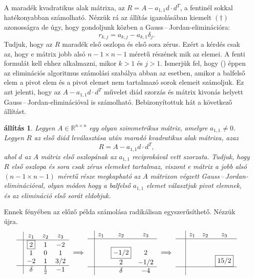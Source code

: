 \documentclass[a4paper, showtrims]{memoir}
\theoremstyle{plain}
\newtheorem{proposition}{állítás}[chapter]
\theoremstyle{remark}
\theoremstyle{definition}
\begin{document}
A maradék kvadratikus alak mátrixa, az $R=A-a_{1,1}d\cdot d^T$, a fentinél sokkal
hatékonyabban számolható.
Nézzük rá az állítás igazolásában kiemelt $(\dag)$ azonosságra de úgy,
hogy gondoljunk közben a Gauss\,--\,Jordan-eliminációra:
    \[
        r_{k,j}=
        a_{k,j}-a_{k,1}\delta_j.
        \tag{\dag}
    \]
Tudjuk, hogy az $R$ maradék első oszlopa és első sora zérus.
Ezért a kérdés csak az, 
hogy e mátrix jobb alsó $n-1\times n-1$ méretű részének mik az elemei.
A fenti formulát kell ehhez alkalmazni, mikor $k>1$ és $j>1$.
Ismerjük fel, hogy (\dag)  éppen az eliminációs algoritmus számolási szabálya abban az esetben, 
amikor a balfelső elem a pivot elem és a pivot elemet nem tartalmazó sorok elemeit számoljuk.
Ez azt jelenti, hogy az $A-a_{1,1}d\cdot d^T$ művelet diád szorzás és mátrix kivonás helyett Gauss\,--\,Jordan-eliminációval is számolható.
Bebizonyítottuk hát a következő állítást.
\begin{proposition}
   Legyen $A\in\mathbb{R}^{n\times n}$ egy olyan szimmetrikus mátrix,
   amelyre $a_{1,1}\neq 0$.
   Legyen $R$ az első diád leválasztása után maradó kvadratikus alak mátrixa,
   azaz 
   $$R=A-a_{1,1}d\cdot d^T,$$
   ahol $d$ az $A$ mátrix első oszlopának az $a_{1,1}$ reciprokával vett szorzata.
   Tudjuk, hogy $R$ első oszlopa és sora csak zérus elemeket tartalmaz, viszont e
   mátrix a jobb alsó $\left(n-1\times n-1  \right)$ méretű része megkapható
   az $A$ mátrixon végzett Gauss\,--\,Jordan-eliminációval, 
   olyan módon hogy a balfelső $a_{1,1}$ elemet választjuk pivot elemnek, 
   és az elimináció első sorát eldobjuk.
\end{proposition}
Ennek fényében az előző példa számolása radikálisan egyszerűsíthető. Nézzük újra.
\[
\begin{array}{c|ccc}
     & z_1       & z_2 & z_3 \\
     \hline
     & \boxed{2} & 1   & -2  \\
     & 1         & 0   & 1   \\
     & -2        & 1   & 3/2 \\
    \hline
    & \delta    & \frac{1}{2}   & -1
\end{array}
\implies
\begin{array}{c|ccc}
     & z_1       & z_2  & z_3 \\
     \hline
     & &                &       \\
     & & \boxed{-1/2}   & 2     \\
     & &            2   & -1/2  \\
     \hline
     & & \delta         & -4
\end{array}
\implies
\begin{array}{c|ccc}
     & z_1       & z_2 & z_3 \\
     \hline
     & &   &     \\
     & &   &     \\
     & &   & \boxed{15/2}    \\
    \hline
    \phantom{\delta}
\end{array}
\]
\end{document}
